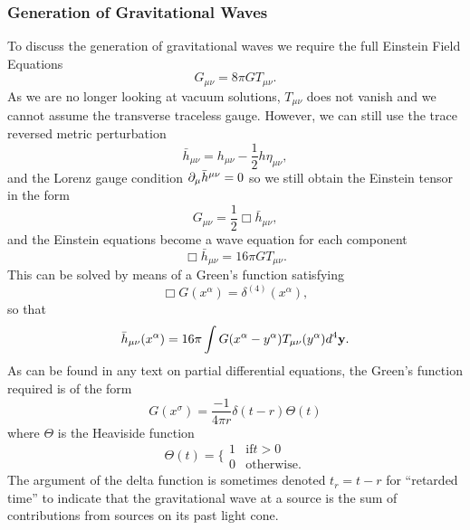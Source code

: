 \subsubsection{Generation of Gravitational Waves}
To discuss the generation of gravitational waves we require the full Einstein Field Equations
\begin{equation}
G_{\mu \nu} = 8 \pi G T_{\mu \nu}.
\end{equation}
As we are no longer looking at vacuum solutions, $T_{\mu \nu}$ does not vanish and we cannot assume the transverse traceless gauge. However, we can still use the trace reversed metric perturbation 
\begin{equation}
\bar{h}_{\mu \nu} = h_{\mu \nu} - \frac{1}{2} h \eta_{\mu \nu},
\end{equation}
and the Lorenz gauge condition ${\partial}_{\mu}\bar{h}^{\mu \nu} = 0$ so we still obtain the Einstein tensor in the form 
\begin{equation}
G_{\mu\nu} = \frac{1}{2} \Box \bar{h}_{\mu \nu},
\end{equation}
and the Einstein equations become a wave equation for each component 
\begin{equation}
\Box \bar{h}_{\mu \nu}=16 \pi G T_{\mu \nu}.
\end{equation}
This can be solved by means of a Green's function satisfying
\begin{equation}\label{eq:Greens}
\Box G(x^{\alpha}) = \delta^{(4)} (x^{\alpha}),
\end{equation}
so that 
\begin{equation}
\bar{h}_{\mu \nu}(x^{\alpha})= 16\pi \int G(x^{\alpha}-y^{\alpha})T_{\mu \nu} (y^{\alpha}) d^4 {\mathbf{y}}.
\end{equation}
As can be found in any text on partial differential equations, the Green's function required is of the form 
\begin{equation}
G(x^{\sigma})= \frac{-1}{4\pi r}\delta(t-r)\Theta(t)
\end{equation}
where $\Theta$ is the Heaviside function
\begin{equation}
\Theta(t)=\lbrace\begin{array}{lc}
1 & \mbox{if} t>0 \\
0 & \mbox{otherwise.}
\end{array}
\end{equation}
The argument of the delta function is sometimes denoted $t_r = t-r$ for ``retarded time'' to indicate that the gravitational wave at a source is the sum of contributions from sources on its past light cone.

